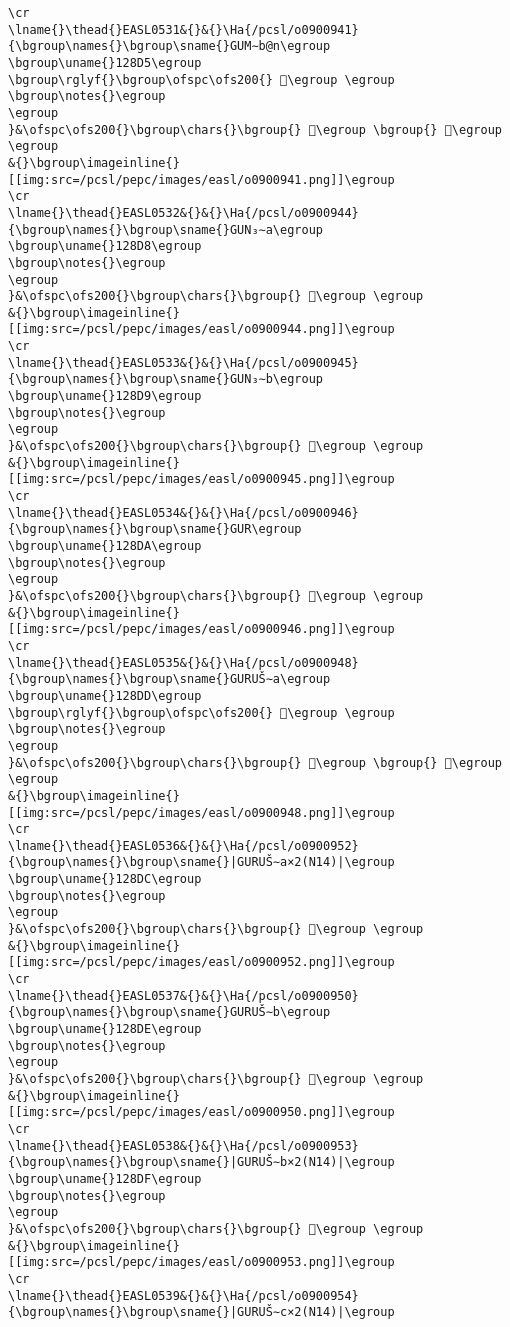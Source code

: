 \begin{verbatim}
\cr
\lname{}\thead{}EASL0531&{}&{}\Ha{/pcsl/o0900941}{\bgroup\names{}\bgroup\sname{}GUM∼b@n\egroup
\bgroup\uname{}128D5\egroup
\bgroup\rglyf{}\bgroup\ofspc\ofs200{} 𒣕\egroup \egroup
\bgroup\notes{}\egroup
\egroup
}&\ofspc\ofs200{}\bgroup\chars{}\bgroup{} 𒣕\egroup \bgroup{} 𒣖\egroup \egroup
&{}\bgroup\imageinline{}[[img:src=/pcsl/pepc/images/easl/o0900941.png]]\egroup
\cr
\lname{}\thead{}EASL0532&{}&{}\Ha{/pcsl/o0900944}{\bgroup\names{}\bgroup\sname{}GUN₃∼a\egroup
\bgroup\uname{}128D8\egroup
\bgroup\notes{}\egroup
\egroup
}&\ofspc\ofs200{}\bgroup\chars{}\bgroup{} 𒣘\egroup \egroup
&{}\bgroup\imageinline{}[[img:src=/pcsl/pepc/images/easl/o0900944.png]]\egroup
\cr
\lname{}\thead{}EASL0533&{}&{}\Ha{/pcsl/o0900945}{\bgroup\names{}\bgroup\sname{}GUN₃∼b\egroup
\bgroup\uname{}128D9\egroup
\bgroup\notes{}\egroup
\egroup
}&\ofspc\ofs200{}\bgroup\chars{}\bgroup{} 𒣙\egroup \egroup
&{}\bgroup\imageinline{}[[img:src=/pcsl/pepc/images/easl/o0900945.png]]\egroup
\cr
\lname{}\thead{}EASL0534&{}&{}\Ha{/pcsl/o0900946}{\bgroup\names{}\bgroup\sname{}GUR\egroup
\bgroup\uname{}128DA\egroup
\bgroup\notes{}\egroup
\egroup
}&\ofspc\ofs200{}\bgroup\chars{}\bgroup{} 𒣚\egroup \egroup
&{}\bgroup\imageinline{}[[img:src=/pcsl/pepc/images/easl/o0900946.png]]\egroup
\cr
\lname{}\thead{}EASL0535&{}&{}\Ha{/pcsl/o0900948}{\bgroup\names{}\bgroup\sname{}GURUŠ∼a\egroup
\bgroup\uname{}128DD\egroup
\bgroup\rglyf{}\bgroup\ofspc\ofs200{} 𒣝\egroup \egroup
\bgroup\notes{}\egroup
\egroup
}&\ofspc\ofs200{}\bgroup\chars{}\bgroup{} 𒣛\egroup \bgroup{} 𒣝\egroup \egroup
&{}\bgroup\imageinline{}[[img:src=/pcsl/pepc/images/easl/o0900948.png]]\egroup
\cr
\lname{}\thead{}EASL0536&{}&{}\Ha{/pcsl/o0900952}{\bgroup\names{}\bgroup\sname{}|GURUŠ∼a×2(N14)|\egroup
\bgroup\uname{}128DC\egroup
\bgroup\notes{}\egroup
\egroup
}&\ofspc\ofs200{}\bgroup\chars{}\bgroup{} 𒣜\egroup \egroup
&{}\bgroup\imageinline{}[[img:src=/pcsl/pepc/images/easl/o0900952.png]]\egroup
\cr
\lname{}\thead{}EASL0537&{}&{}\Ha{/pcsl/o0900950}{\bgroup\names{}\bgroup\sname{}GURUŠ∼b\egroup
\bgroup\uname{}128DE\egroup
\bgroup\notes{}\egroup
\egroup
}&\ofspc\ofs200{}\bgroup\chars{}\bgroup{} 𒣞\egroup \egroup
&{}\bgroup\imageinline{}[[img:src=/pcsl/pepc/images/easl/o0900950.png]]\egroup
\cr
\lname{}\thead{}EASL0538&{}&{}\Ha{/pcsl/o0900953}{\bgroup\names{}\bgroup\sname{}|GURUŠ∼b×2(N14)|\egroup
\bgroup\uname{}128DF\egroup
\bgroup\notes{}\egroup
\egroup
}&\ofspc\ofs200{}\bgroup\chars{}\bgroup{} 𒣟\egroup \egroup
&{}\bgroup\imageinline{}[[img:src=/pcsl/pepc/images/easl/o0900953.png]]\egroup
\cr
\lname{}\thead{}EASL0539&{}&{}\Ha{/pcsl/o0900954}{\bgroup\names{}\bgroup\sname{}|GURUŠ∼c×2(N14)|\egroup

\end{verbatim}

